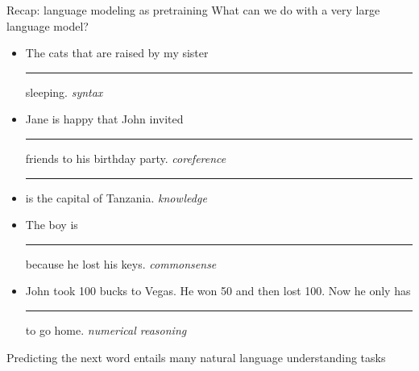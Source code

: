 \documentclass[usenames,dvipsnames,notes,11pt,aspectratio=169,hyperref={colorlinks=true, linkcolor=blue}]{beamer}
\begin{document}
\begin{frame}
    {Recap: language modeling as pretraining}
    What can we do with a very large language model?
    \begin{itemize}
        \itemsep1em
        \item The cats that are raised by my sister \rule{1.5cm}{0.5mm} sleeping. \hfill \textit{syntax}
        \item Jane is happy that John invited \rule{1.5cm}{0.5mm} friends to his birthday party. \hfill \textit{coreference}
        \item \rule{1.5cm}{0.5mm} is the capital of Tanzania. \hfill \textit{knowledge}
        \item The boy is \rule{1.5cm}{0.5mm} because he lost his keys.  \hfill \textit{commonsense}
        \item John took 100 bucks to Vegas. He won 50 and then lost 100. Now he only has \rule{1.5cm}{0.5mm} to go home. \hfill \textit{numerical reasoning}
    \end{itemize}
    Predicting the next word entails many natural language understanding tasks
\end{frame}
\end{document}

